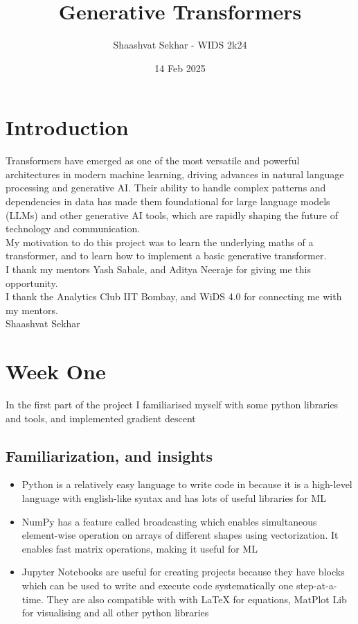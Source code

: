 \documentclass[12pt,a4paper]{article}
\title{Generative Transformers}
\author{Shaashvat Sekhar - WIDS 2k24}
\date{14 Feb 2025}
\begin{document}
\maketitle

\tableofcontents
\pagebreak
\section{Introduction}

Transformers have emerged as one of the most versatile and powerful architectures in modern machine learning, driving advances in natural language processing and generative AI. Their ability to handle complex patterns and dependencies in data has made them foundational for large language models (LLMs) and other generative AI tools, which are rapidly shaping the future of technology and communication.\\

My motivation to do this project was to learn the underlying maths of a transformer, and to learn how to implement a basic generative transformer.\\

I thank my mentors Yash Sabale, and Aditya Neeraje for giving me this opportunity. \\

I thank the Analytics Club IIT Bombay, and WiDS 4.0 for connecting me with my mentors. \\

Shaashvat Sekhar


\pagebreak


\section{Week One}
In the first part of the project I familiarised myself with some python libraries and tools, and implemented gradient descent
\subsection{Familiarization, and insights}
\begin{itemize}
\item Python is a relatively easy language to write code in because it is a high-level language with english-like syntax and has lots of useful libraries for ML
\item NumPy has a feature called broadcasting which enables simultaneous element-wise operation on arrays of different shapes using vectorization. It enables fast matrix operations, making it useful for ML
\item Jupyter Notebooks are useful for creating projects because they have blocks which can be used to write and execute code systematically one step-at-a-time. They are also compatible with with LaTeX for equations, MatPlot Lib for visualising and all other python libraries
\end{itemize}
\end{document}
